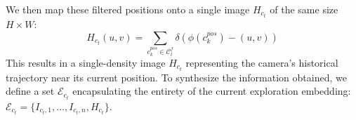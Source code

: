 We then map these filtered positions onto a single image $H_{c_t}$ of the same size $H \times W$:
%
\begin{equation}
H_{c_t}(u, v) = \sum_{c^{pos}_k \in \mathcal{C}_t^f} \delta(\phi(c^{pos}_k) - (u, v))
\end{equation}
%
This results in a single-density image $H_{c_t}$ representing the camera's historical trajectory near its current position. To synthesize the information obtained, we define a set $\mathcal{E}_{c_t}$ encapsulating the entirety of the current exploration embedding: $\mathcal{E}_{c_t} = \{I_{{c_t},1}, \ldots, I_{{c_t},n}, H_{c_t}\}$.

